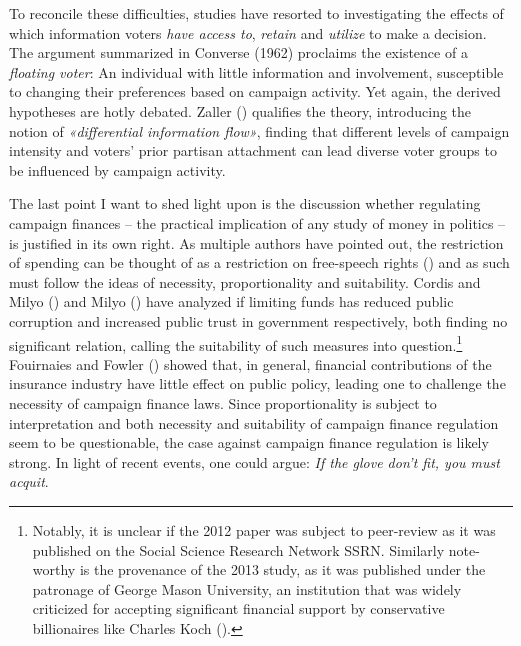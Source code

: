 \documentclass[11pt,a4paper]{article}
\begin{document}
To reconcile these difficulties, studies have resorted to investigating the effects of which information voters \textit{have access to}, \textit{retain} and \textit{utilize} to make a decision. The argument summarized in Converse (1962) proclaims the existence of a \textit{floating voter}: An individual with little information and involvement, susceptible to changing their preferences based on campaign activity. Yet again, the derived hypotheses are hotly debated. Zaller (\citeyear{zaller_bringing_1989}) qualifies the theory, introducing the notion of \textit{«differential information flow»}, finding that different levels of campaign intensity and voters’ prior partisan attachment can lead diverse voter groups to be influenced by campaign activity.

The last point I want to shed light upon is the discussion whether regulating campaign finances – the practical implication of any study of money in politics – is justified in its own right. As multiple authors have pointed out, the restriction of spending can be thought of as a restriction on free-speech rights (\cite{kang_end_2012,ortiz_democratic_1998}) and as such must follow the ideas of necessity, proportionality and suitability. Cordis and Milyo (\citeyear{cordis_state_2013}) and Milyo (\citeyear{milyo_state_2012}) have analyzed if limiting funds has reduced public corruption and increased public trust in government respectively, both finding no significant relation, calling the suitability of such measures into question.\footnote{Notably, it is unclear if the 2012 paper was subject to peer-review as it was published on the Social Science Research Network SSRN. Similarly note-worthy is the provenance of the 2013 study, as it was published under the patronage of George Mason University, an institution that was widely criticized for accepting significant financial support by conservative billionaires like Charles Koch (\cite{larimer_george_2018}).} Fouirnaies and Fowler (\citeyear{fouirnaies_campaign_2022}) showed that, in general, financial contributions of the insurance industry have little effect on public policy, leading one to challenge the necessity of campaign finance laws. Since proportionality is subject to interpretation and both necessity and suitability of campaign finance regulation seem to be questionable, the case against campaign finance regulation is likely strong. In light of recent events, one could argue: \textit{If the glove don’t fit, you must acquit}.
\end{document}
